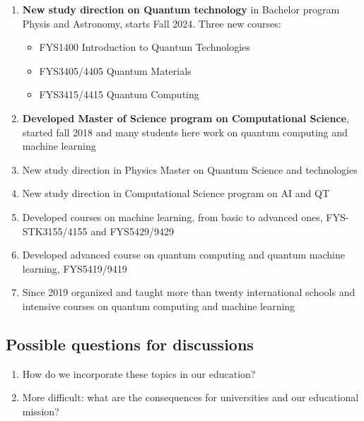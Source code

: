 \documentclass[%
oneside,                 %
final,                   %
10pt]{article}
\begin{document}
\begin{enumerate}
\item \textbf{New study direction on Quantum technology} in Bachelor program Physis and Astronomy, starts Fall 2024. Three new courses:
\begin{itemize}

  \item FYS1400 Introduction to Quantum Technologies

  \item FYS3405/4405 Quantum Materials

  \item FYS3415/4415 Quantum Computing

\end{itemize}

\noindent
\item \textbf{Developed Master of Science program on Computational Science}, started fall  2018 and many students here work on quantum computing and machine learning

\item New study direction in Physics Master on Quantum Science and technologies

\item New study direction in Computational Science program on AI and QT

\item Developed courses on machine learning, from basic to advanced ones, FYS-STK3155/4155 and FYS5429/9429

\item Developed advanced course on quantum computing and quantum machine learning, FYS5419/9419

\item Since 2019 organized and taught more than twenty  international schools and intensive courses on quantum computing and machine learning
\end{enumerate}

\noindent
\subsection{Possible questions for discussions}

\begin{enumerate}
\item How do we incorporate these topics in our education?

\item More difficult: what are the consequences for universities and our educational mission?
\end{enumerate}
\end{document}
